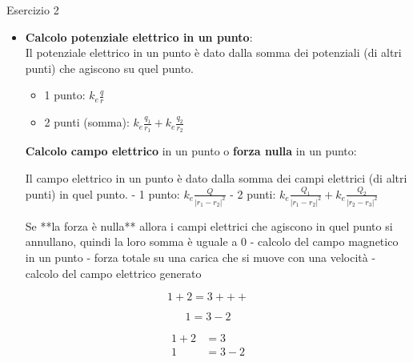 \documentclass{article}
\begin{document}
Esercizio 2
\begin{itemize}
\item \textbf{Calcolo potenziale elettrico in un punto}:
    \\Il potenziale elettrico in un punto è dato dalla somma dei potenziali (di altri punti) che agiscono su quel punto.
    \begin{itemize}
        \item 1 punto: $k_e\frac{q}{r}$
        \item 2 punti (somma): $k_e\frac{q_1}{r_1}+k_e\frac{q_2}{r_2}$
    \end{itemize}
    \textbf{Calcolo campo elettrico} in un punto o \textbf{forza nulla} in un punto:
    
    Il campo elettrico in un punto è dato dalla somma dei campi elettrici (di altri punti) in quel punto.
    - 1 punto: $k_e\frac{Q}{|r_1-r_2|^2}$
    - 2 punti: $k_e\frac{Q_1}{|r_1-r_2|^2}+k_e\frac{Q_2}{|r_2-r_3|^2}$
  
    Se **la forza è nulla** allora i campi elettrici che agiscono in quel punto si annullano, quindi la loro somma è uguale a $0$
- calcolo del campo magnetico in un punto
- forza totale su una carica che si muove con una velocità
- calcolo del campo elettrico generato 
\end{itemize}

\begin{equation*}
  1 + 2 = 3 +++
\end{equation*}

\begin{equation*}
  1 = 3 - 2
\end{equation*}

\begin{align*}
  1 + 2 &= 3\\
  1 &= 3 - 2
\end{align*}
\end{document}
